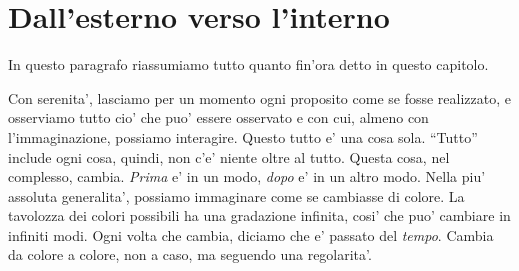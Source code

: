 %
%


%
%



\section{Dall'esterno verso l'interno}
\label{extInt}
In questo paragrafo riassumiamo tutto quanto fin'ora detto in questo capitolo.

Con serenita', lasciamo per un momento ogni proposito come se fosse realizzato, e osserviamo tutto cio' che puo' essere osservato e con cui, almeno con l'immaginazione, possiamo interagire. Questo tutto e' una cosa sola. ``Tutto'' include ogni cosa, quindi, non c'e' niente oltre al tutto.
Questa cosa, nel complesso, cambia. \emph{Prima} e' in un modo, \emph{dopo} e' in un altro modo. Nella piu' assoluta generalita', possiamo immaginare come se cambiasse di colore. La tavolozza dei colori possibili ha una gradazione infinita, cosi' che puo' cambiare in infiniti modi. Ogni volta che cambia, diciamo che e' passato del \emph{tempo}. Cambia da colore a colore, non a caso, ma seguendo una regolarita'. 

